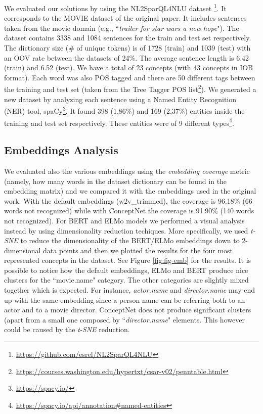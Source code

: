 \documentclass[11pt,a4paper]{article}
\begin{document}
We evaluated our solutions by using the NL2SparQL4NLU dataset \footnote{\url{https://github.com/esrel/NL2SparQL4NLU}}. It corresponds to the MOVIE dataset of the original paper. It includes sentences taken from the movie domain (e.g., ``\textit{trailer for star wars a new hope}"). The dataset contains 3338 and 1084 sentences for the train and test set respectively. The dictionary size (\# of unique tokens) is of 1728 (train) and 1039 (test) with an OOV rate between the datasets of 24\%. The average sentence length is 6.42 (train) and 6.52 (test). We have a total of 23 concepts (with 43 concepts in IOB format). Each word was also POS tagged and there are 50 different tags between the training and test set (taken from the Tree Tagger POS list\footnote{\url{https://courses.washington.edu/hypertxt/csar-v02/penntable.html}}).
We generated a new dataset by analyzing each sentence using a Named Entity Recognition (NER) tool, spaCy\footnote{\url{https://spacy.io/}}. It found 398 (1,86\%)  and 169 (2,37\%) entities inside the training and test set respectively. These entities were of 9 different types\footnote{\url{https://spacy.io/api/annotation\#named-entities}}.

\subsection{Embeddings Analysis}
We evaluated also the various embeddings using the \textit{embedding coverage} metric (namely, how many words in the dataset dictionary can be found in the embedding matrix) and we compared it with the embeddings used in the original work. With the default embeddings (w2v\_trimmed), the coverage is 96.18\% (66 words not recognized) while with ConceptNet the coverage is 91.90\% (140 words not recognized). For BERT and ELMo models we performed a visual analysis instead by using dimensionality reduction techiques. More specifically, we used \textit{t-SNE} \cite{Maaten2008VisualizingDU} to reduce the dimensionality of the BERT/ELMo embeddings down to 2-dimensional data points and then we plotted the results for the four most represented concepts in the dataset. See Figure \ref{fig:fig-emb} for the results. It is possible to notice how the default embeddings, ELMo and BERT produce nice clusters for the ``movie.name" category. The other categories are slightly mixed together which is expected. For instance, \textit{actor.name} and \textit{director.name} may end up with the same embedding since a person name can be referring both to an actor and to a movie director. ConceptNet does not produce significant clusters (apart from a small one composed by ``\textit{director.name}" elements. This however could be caused by the \textit{t-SNE} reduction.
\end{document}
